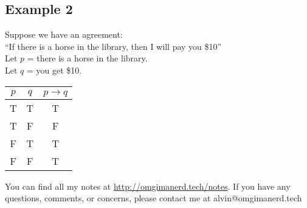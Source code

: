 \documentclass{math}
\begin{document}
\subsection*{Example 2}
Suppose we have an agreement: \\
``If there is a horse in the library, then I will pay you \$10'' \\
Let \( p \) = there is a horse in the library. \\
Let \( q \) = you get \$10.
\begin{center}
  \begin{tabular}{|c|c|c|}
    \hline
    \( p \) & \( q \) & \( p \to q \) \\ \hline
    T       & T       & T \\ \hline
    T       & F       & F \\ \hline
    F       & T       & T \\ \hline
    F       & F       & T \\ \hline
  \end{tabular}
\end{center}

\begin{center}
  You can find all my notes at \url{http://omgimanerd.tech/notes}. If you have
  any questions, comments, or concerns, please contact me at
  alvin@omgimanerd.tech
\end{center}
\end{document}
